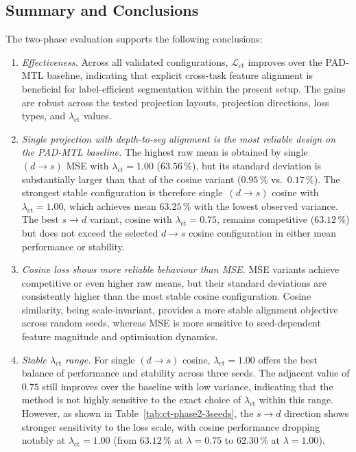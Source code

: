 \subsection{Summary and Conclusions}
\label{subsec:ct-summary}

\noindent
The two-phase evaluation supports the following conclusions:

\begin{enumerate}

\item \textit{Effectiveness.} Across all validated configurations,
  $\mathcal{L}_\text{ct}$ improves over the PAD-MTL baseline,
  indicating that explicit cross-task feature alignment is beneficial
  for label-efficient segmentation within the present setup. The gains
  are robust across the tested projection layouts, projection directions,
  loss types, and $\lambda_\text{ct}$ values.

\item \textit{Single projection with depth-to-seg alignment is the most
  reliable design on the PAD-MTL baseline.}
  The highest raw mean is obtained by single~$(d{\rightarrow}s)$ MSE
  with $\lambda_\text{ct}=1.00$ ($63.56$\,\%), but its standard
  deviation is substantially larger than that of the cosine variant
  ($0.95$\,\% vs.\ $0.17$\,\%). The strongest stable configuration is
  therefore single~$(d{\rightarrow}s)$ cosine with
  $\lambda_\text{ct}=1.00$, which achieves mean $63.25$\,\% with the
  lowest observed variance. The best $s{\rightarrow}d$ variant, cosine
  with $\lambda_\text{ct}=0.75$, remains competitive ($63.12$\,\%) but
  does not exceed the selected $d{\rightarrow}s$ cosine configuration in
  either mean performance or stability.

\item \textit{Cosine loss shows more reliable behaviour than MSE.}
  MSE variants achieve competitive or even higher raw means, but their
  standard deviations are consistently higher than the most stable cosine
  configuration. Cosine similarity, being scale-invariant, provides a
  more stable alignment objective across random seeds, whereas MSE is
  more sensitive to seed-dependent feature magnitude and optimisation
  dynamics.

\item \textit{Stable $\lambda_\text{ct}$ range.}
  For single $(d{\rightarrow}s)$ cosine, $\lambda_\text{ct}=1.00$
  offers the best balance of performance and stability across three
  seeds. The adjacent value of $0.75$ still improves over the baseline
  with low variance, indicating that the method is not highly sensitive
  to the exact choice of $\lambda_\text{ct}$ within this range. However,
  as shown in Table~\ref{tab:ct-phase2-3seeds}, the $s{\rightarrow}d$
  direction shows stronger sensitivity to the loss scale, with cosine
  performance dropping notably at $\lambda_\text{ct}=1.00$ (from
  $63.12$\,\% at $\lambda=0.75$ to $62.30$\,\% at $\lambda=1.00$).

\end{enumerate}

